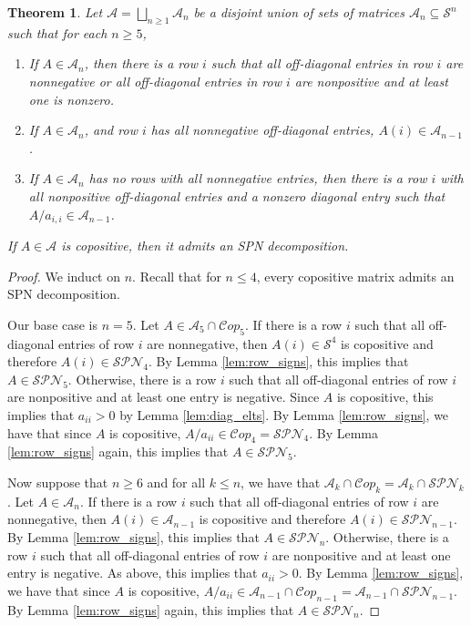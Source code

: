 \documentclass{amsart}
\newcommand{\cA}{\mathcal{A}}
\newcommand{\cS}{\mathcal{S}}
\newcommand{\Cop}{\mathcal{C}op}
\newcommand{\SPN}{\mathcal{SPN}}
\newtheorem{theorem}{Theorem}[section]
\theoremstyle{definition}
\begin{document}
\begin{theorem}\label{thm:MainTheoremGeneral}
Let $\cA = \bigsqcup_{n \geq 1}\cA_n$ be a disjoint union of sets of matrices $\cA_n \subseteq \cS^n$ such that for each $n \geq 5$,

\begin{enumerate}[label = (\ref{thm:MainTheoremGeneral}.\Roman*), ref = (\ref{thm:MainTheoremGeneral}.\Roman*)]
\item\label{itm:GenTheoremUniformRow} If $A \in \cA_n$, then there is a row $i$ such that all off-diagonal entries in row $i$ are nonnegative or all off-diagonal entries in row $i$ are nonpositive and at least one is nonzero.
\item\label{itm:GenTheoremDeleteNonneg} If $A \in \cA_n$, and row $i$ has all nonnegative off-diagonal entries, $A(i) \in \cA_{n-1}$.
\item\label{itm:GenTheoremSchur} If $A \in \cA_n$ has no rows with all nonnegative entries, then there is a row $i$ with all nonpositive off-diagonal entries and a nonzero diagonal entry such that $A/a_{i,i} \in \cA_{n-1}$. 
\end{enumerate}

If $A \in \cA$ is copositive, then it admits an SPN decomposition. 
\end{theorem}

\begin{proof}
We induct on $n$. Recall that for $n \leq 4$, every copositive matrix admits an SPN decomposition. 

Our base case is $n = 5$. Let $A \in \cA_5 \cap \Cop_5$. If there is a row $i$ such that all off-diagonal entries of row $i$ are nonnegative, then $A(i) \in \cS^{4}$ is copositive and therefore $A(i) \in \SPN_4$. By Lemma \ref{lem:row_signs}, this implies that $A \in \SPN_5$. Otherwise, there is a row $i$ such that all off-diagonal entries of row $i$ are nonpositive and at least one entry is negative. Since $A$ is copositive, this implies that $a_{ii}>0$ by Lemma \ref{lem:diag_elts}. By Lemma \ref{lem:row_signs}, we have that since $A$ is copositive, $A/a_{ii} \in \Cop_4 = \SPN_4$. By Lemma \ref{lem:row_signs} again, this implies that $A \in \SPN_5$. 

Now suppose that $n \geq 6$ and for all $k \leq n$, we have that $\cA_k \cap \Cop_k = \cA_k \cap \SPN_k$. Let $A \in \cA_n$.  If there is a row $i$ such that all off-diagonal entries of row $i$ are nonnegative, then $A(i) \in \cA_{n-1}$ is copositive and therefore $A(i) \in \SPN_{n-1}$. By Lemma \ref{lem:row_signs}, this implies that $A \in \SPN_n$. Otherwise, there is a row $i$ such that all off-diagonal entries of row $i$ are nonpositive and at least one entry is negative. As above, this implies that $a_{ii}>0$. By Lemma \ref{lem:row_signs}, we have that since $A$ is copositive, $A/a_{ii} \in \cA_{n-1}\cap \Cop_{n-1} = \cA_{n-1} \cap \SPN_{n-1}$. By Lemma \ref{lem:row_signs} again, this implies that $A \in \SPN_{n}$. 
\end{proof}
\end{document}
